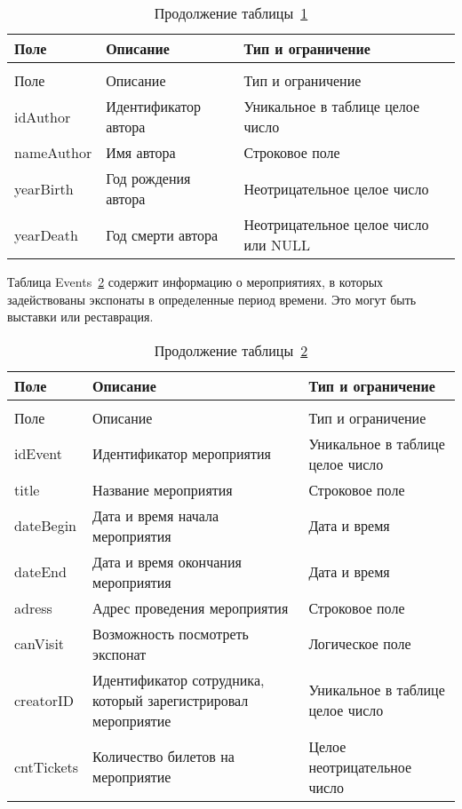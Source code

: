 \begin{longtable}{|
		>{\centering\arraybackslash}m{}|
		>{\centering\arraybackslash}m{}|
		>{\centering\arraybackslash}m{}|
	}
	\caption{Таблица Автор (Author)}\label{tbl:Author} \\\hline
	Поле & Описание & Тип и ограничение  \\\hline    
	\endfirsthead
	\caption*{Продолжение таблицы~\ref{tbl:Author} } \\\hline
	Поле & Описание & Тип и ограничение  \\\hline           
	\endhead
	\endfoot
	idAuthor & Идентификатор автора & Уникальное в таблице целое число \\\hline
	nameAuthor & Имя автора & Строковое поле \\\hline
	yearBirth & Год рождения автора & Неотрицательное целое число \\\hline
	yearDeath & Год смерти автора & Неотрицательное целое число или NULL \\\hline
\end{longtable}

Таблица Events~\ref{tbl:Events} содержит информацию о мероприятиях, в которых задействованы экспонаты в определенные период времени. Это могут быть выставки или реставрация. 

\begin{longtable}{|
		>{\centering\arraybackslash}m{.33\textwidth - 2\tabcolsep}|
		>{\centering\arraybackslash}m{.34\textwidth - 2\tabcolsep}|
		>{\centering\arraybackslash}m{.33\textwidth - 2\tabcolsep}|
	}
	\caption{Таблица Мероприятия (Events)}\label{tbl:Events} \\\hline
	Поле & Описание & Тип и ограничение  \\\hline    
	\endfirsthead
	\caption*{Продолжение таблицы~\ref{tbl:Events} } \\\hline
	Поле & Описание & Тип и ограничение  \\\hline           
	\endhead
	\endfoot
	idEvent & Идентификатор мероприятия & Уникальное в таблице целое число \\\hline
	title & Название мероприятия & Строковое поле \\\hline
	dateBegin & Дата и время начала мероприятия & Дата и время \\\hline
	dateEnd & Дата и время окончания мероприятия & Дата и время \\\hline
	adress & Адрес проведения мероприятия & Строковое поле \\\hline
	canVisit & Возможность посмотреть экспонат & Логическое поле \\\hline
	creatorID & Идентификатор сотрудника, который зарегистрировал мероприятие & Уникальное в таблице целое число \\\hline
	cntTickets & Количество билетов на мероприятие & Целое неотрицательное число \\\hline
\end{longtable}


